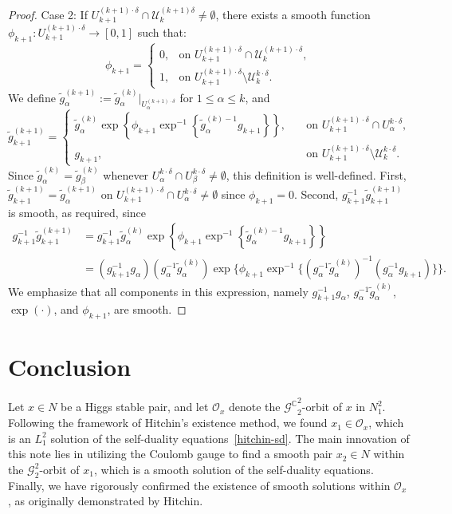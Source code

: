 \documentclass[a4paper]{amsart}
\theoremstyle{definition}
\theoremstyle{remark}
\numberwithin{equation}{section}
\begin{document}
\begin{proof}
Case 2: If $U_{k+1}^{(k+1)\cdot\delta} \cap \mathcal{U}_k^{(k+1)\delta} \neq \emptyset$, there exists a smooth function $\phi_{k+1}: U_{k+1}^{(k+1)\cdot\delta} \to [0, 1]$ such that:
\[
\phi_{k+1} =
\begin{cases} 
0, & \text{on } U_{k+1}^{(k+1)\cdot\delta} \cap \mathcal{U}_k^{(k+1)\cdot\delta}, \\ 
1, & \text{on } U_{k+1}^{(k+1)\cdot\delta} \setminus \mathcal{U}_k^{k\cdot\delta}.
\end{cases}
\]
We define $\tilde{g}_\alpha^{(k+1)} := \tilde{g}_\alpha^{(k)}\big|_{U_\alpha^{(k+1)\cdot\delta}}$ for $1 \leq \alpha \leq k$, and
\[
\tilde{g}_{k+1}^{(k+1)} = 
\begin{cases}
\tilde{g}_\alpha^{(k)} \exp\left\{\phi_{k+1} \exp^{-1} \left\{\tilde{g}_\alpha^{(k)-1} g_{k+1}\right\}\right\}, & \quad \text{on } U_{k+1}^{(k+1)\cdot\delta} \cap U_\alpha^{k\cdot\delta}, \\ 
g_{k+1}, & \quad \text{on } U_{k+1}^{(k+1)\cdot\delta} \setminus \mathcal{U}_k^{k\cdot\delta}.
\end{cases}
\]
Since $\tilde{g}_\alpha^{(k)} = \tilde{g}_\beta^{(k)}$ whenever $U_\alpha^{k\cdot\delta} \cap U_\beta^{k\cdot\delta} \neq \emptyset$, this definition is well-defined. First, $\tilde{g}_{k+1}^{(k+1)} = \tilde{g}_\alpha^{(k+1)}$ on $U_{k+1}^{(k+1)\cdot\delta} \cap U_\alpha^{k\cdot\delta} \neq \emptyset$ since $\phi_{k+1} = 0$. Second, $g_{k+1}^{-1} \tilde{g}_{k+1}^{(k+1)}$ is smooth, as required, since
\begin{align*}
g_{k+1}^{-1} \tilde{g}_{k+1}^{(k+1)} &= g_{k+1}^{-1} \tilde{g}_\alpha^{(k)} \exp\left\{\phi_{k+1} \exp^{-1} \left\{\tilde{g}_\alpha^{(k)-1} g_{k+1}\right\}\right\} \\ 
&= \left(g_{k+1}^{-1} g_\alpha\right)\left(g_\alpha^{-1} \tilde{g}_\alpha^{(k)}\right) \exp\Big\{\phi_{k+1} \exp^{-1}\Big\{\left(g_\alpha^{-1} \tilde{g}_\alpha^{(k)}\right)^{-1} \left(g_\alpha^{-1} g_{k+1}\right)\Big\}\Big\}.
\end{align*}
We emphasize that all components in this expression, namely $g_{k+1}^{-1} g_\alpha$, $g_\alpha^{-1} \tilde{g}_\alpha^{(k)}$, $\exp(\cdot)$, and $\phi_{k+1}$, are smooth. 
\end{proof}

\section{Conclusion}

Let $x \in N$ be a Higgs stable pair, and let $\mathcal{O}_x$ denote the ${\mathscr{G}^\mathbb{C}}_2^2$-orbit of $x$ in $N_1^2$. Following the framework of Hitchin's existence method, we found $x_1 \in \mathcal{O}_x$, which is an $L_1^2$ solution of the self-duality equations~\eqref{hitchin-sd}. The main innovation of this note lies in utilizing the Coulomb gauge to find a smooth pair $x_2 \in N$ within the ${\mathscr{G}_2^2}$-orbit of $x_1$, which is a smooth solution of the self-duality equations. Finally, we have rigorously confirmed the existence of smooth solutions within $\mathcal{O}_x$, as originally demonstrated by Hitchin.\\
\end{document}
